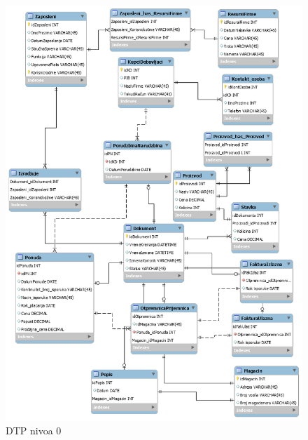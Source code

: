 \begin{figure}[ht]
\centering
\includegraphics[width=165mm]{slike/er_diagram.png}%
\caption{DTP nivoa 0}
\end{figure}

\clearpage